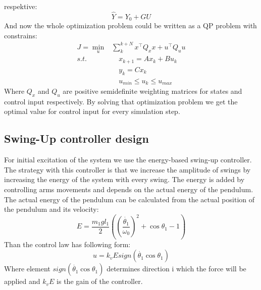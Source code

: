 respektive:
\begin{equation}
	\hat{Y} = Y_0 + GU
\end{equation}
And now the whole optimization problem could be written as a QP problem with constrains:
\begin{equation}\label{mpcformulation}
\begin{split}
J = \min_{u}& \sum_{k}^{k+N}x^\intercal Q_xx+u^\intercal Q_uu\\
s.t.&\quad  x_{k+1} = Ax_k + Bu_k\\
&\quad  y_{k} = Cx_k\\
& \quad u_{min}\leq u_k\leq u_{max}
\end{split}
\end{equation}
Where $Q_x$ and $Q_u$ are positive semidefinite weighting matrices for states and control input respectively.
By solving that optimization problem we get the optimal value for control input for every simulation step.
\subsection{Swing-Up controller design}
For initial excitation of the system we use the energy-based swing-up controller. The strategy with this controller is that we increase the amplitude of swings by increasing the energy of the system with every swing. The energy is added by controlling arms movements and depends on the actual energy of the pendulum. The actual energy of the pendulum can be calculated from the actual position of the pendulum and its velocity: 
\begin{equation}
E = \frac{m_1gl_1}{2}((\frac{\dot{\theta_1}}{\omega_0})^2+\cos\theta_1 - 1)
\end{equation}
Than the control law has following form:
\begin{equation}
	u = k_vEsign(\dot{\theta_1}\cos\theta_1)
\end{equation}
Where element $sign(\dot{\theta_1}\cos\theta_1)$ determines direction i which the force will be applied and $k_vE$ is the gain of the controller.







